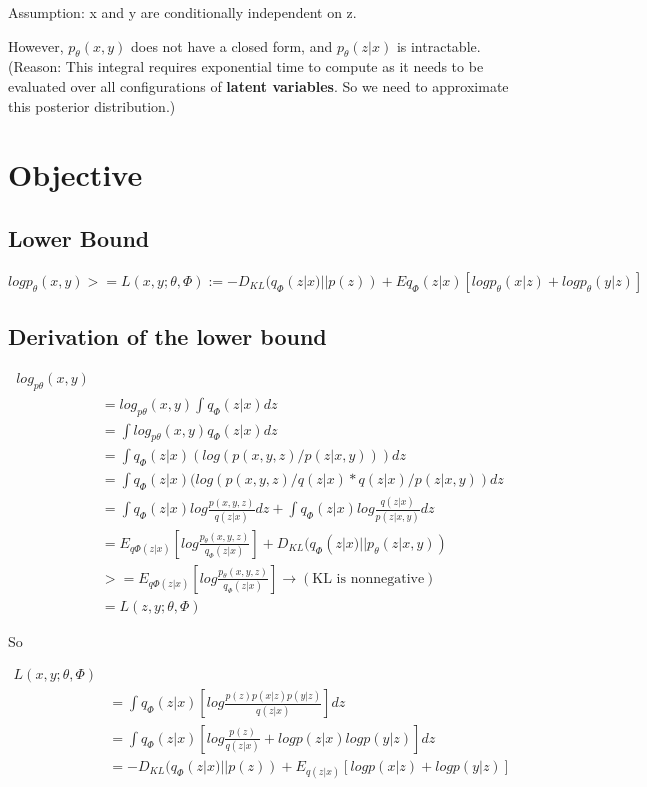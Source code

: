 \documentclass[a4paper]{article}
\begin{document}
Assumption: x and y are conditionally independent on z.

However, $p_\theta(x,y)$ does not have a closed form, and $p_\theta(z|x)$ is intractable. (Reason: This integral requires exponential time to compute as it needs to be evaluated over all configurations of {\bf latent variables}. So we need to approximate this posterior distribution.)

\section{Objective}
\subsection{Lower Bound}

$logp_\theta(x,y) >= L(x,y;\theta,\Phi) := - D_{KL}(q_\Phi(z|x)||p(z)) + E{q_\Phi(z|x)}[logp_\theta(x|z)+logp_\theta(y|z)]$
\subsection{Derivation of the lower bound}
\begin{align*}
log_{p\theta}(x,y)\\
&= log_{p\theta}(x,y) \int q_\Phi(z|x)dz\\
&= \int log_{p\theta}(x,y) q_\Phi(z|x)dz\\
&= \int q_\Phi(z|x) (log(p(x,y,z)/p(z|x,y)))dz\\
&= \int q_\Phi(z|x) (log(p(x,y,z)/q(z|x)* q(z|x)/p(z|x,y)) dz\\
&= \int q_\Phi(z|x) log\frac{p(x,y,z)}{q(z|x)}dz + \int q_\Phi(z|x) log\frac{q(z|x)}{p(z|x,y)}dz\\
&= E_{q\Phi(z|x)}[log\frac{p_\theta(x,y,z)}{q_\Phi(z|x)}]+ D_{KL}(q_\Phi(z|x)||p_\theta(z|x,y))\\
&>= E_{q\Phi(z|x)}[log\frac{p_\theta(x,y,z)}{q_\Phi(z|x)}] \to (\text{KL is nonnegative})\\
&= L(z,y;\theta,\Phi)
\end{align*}

So 

\begin{align*}
L(x,y;\theta,\Phi)\\
&= \int q_\Phi(z|x)[log \frac{p(z)p(x|z)p(y|z)}{q(z|x)}]dz\\
&= \int q_\Phi(z|x)[log \frac{p(z)}{q(z|x)} + logp(z|x) logp(y|z)]dz\\
&= - D_{KL}(q_\Phi(z|x)||p(z)) + E_{q(z|x)}[log p(x|z) + log p(y|z)]
\end{align*}
\end{document}
